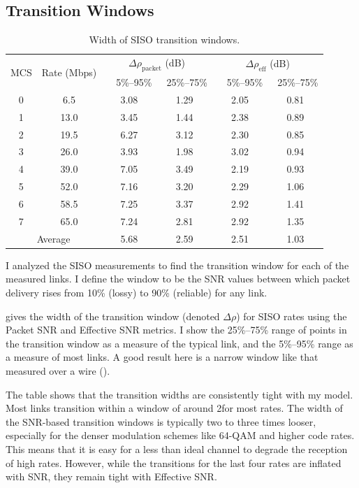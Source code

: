 \subsection{Transition Windows}
\begin{table}
\centering
\begin{tabular}{cccccc}
\toprule
\multirow{2}{*}{MCS} & \multirow{2}{*}{Rate (Mbps)} & \multicolumn{2}{c}{$\Delta\rho_{\text{packet}}$ (dB)} &
\multicolumn{2}{c}{$\Delta\rho_{\text{eff}}$ (dB)} \\ 
\cmidrule(lr){3-4} \cmidrule(lr){5-6}
& &  ~~5\%--95\% & ~25\%--75\% & ~~5\%--95\% & ~25\%--75\%  \\
\midrule 
0 &  6.5                    & 3.08  & 1.29  & 2.05  & 0.81 \\
1 & 13.0                    & 3.45  & 1.44  & 2.38  & 0.89 \\
2 & 19.5                    & 6.27  & 3.12  & 2.30  & 0.85 \\
3 & 26.0                    & 3.93  & 1.98  & 3.02  & 0.94 \\
4 & 39.0                    & 7.05  & 3.49  & 2.19  & 0.93 \\
5 & 52.0                    & 7.16  & 3.20  & 2.29  & 1.06 \\
6 & 58.5                    & 7.25  & 3.37  & 2.92  & 1.41 \\
7 & 65.0                    & 7.24  & 2.81  & 2.92  & 1.35 \\
\midrule
\multicolumn{2}{c}{Average} & 5.68  & 2.59  & 2.51  & 1.03 \\         
\bottomrule
\end{tabular}
\caption[Width of SISO transition windows]{\label{tab:transitions} Width of SISO transition windows.}
\end{table}

I analyzed the SISO measurements to find the transition window for each of the measured links. I define the window to be the SNR values between which packet delivery rises from 10\% (lossy) to 90\% (reliable) for any link.

 gives the width of the transition window (denoted $\Delta\rho$) for SISO rates using the Packet SNR and Effective SNR metrics. I show the 25\%--75\% range of points in the transition window as a measure of the typical link, and the 5\%--95\% range as a measure of most links. A good result here is a narrow window like that measured over a wire ().

The table shows that the transition widths are consistently tight with my model. Most links transition within a window of around 2\dB for most rates. The width of the SNR-based transition windows is typically two to three times looser, especially for the denser modulation schemes like 64-QAM and higher code rates. This means that it is easy for a less than ideal channel to degrade the reception of high rates. However, while the transitions for the last four rates are inflated with SNR, they remain tight with Effective SNR\@. 

